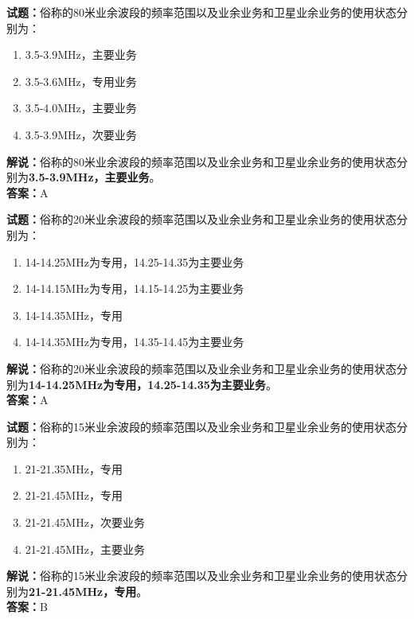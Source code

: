 \documentclass{ctexbook}
\begin{document}
\vspace{\baselineskip}

\noindent\textbf{试题：}俗称的80米业余波段的频率范围以及业余业务和卫星业余业务的使用状态分别为：
\begin{enumerate}[leftmargin=3em]
  \item 3.5-3.9\unit{\MHz}，主要业务
  \item 3.5-3.6\unit{\MHz}，专用业务
  \item 3.5-4.0\unit{\MHz}，主要业务
  \item 3.5-3.9\unit{\MHz}，次要业务
\end{enumerate}
\noindent\textbf{解说：}俗称的80米业余波段的频率范围以及业余业务和卫星业余业务的使用状态分别为\textbf{3.5-3.9\unit{\MHz}，主要业务}。\\\noindent\textbf{答案：}A

\vspace{\baselineskip}

\noindent\textbf{试题：}俗称的20米业余波段的频率范围以及业余业务和卫星业余业务的使用状态分别为：
\begin{enumerate}[leftmargin=3em]
  \item 14-14.25\unit{\MHz}为专用，14.25-14.35为主要业务
  \item 14-14.15\unit{\MHz}为专用，14.15-14.25为主要业务
  \item 14-14.35\unit{\MHz}，专用
  \item 14-14.35\unit{\MHz}为专用，14.35-14.45为主要业务
\end{enumerate}
\noindent\textbf{解说：}俗称的20米业余波段的频率范围以及业余业务和卫星业余业务的使用状态分别为\textbf{14-14.25\unit{\MHz}为专用，14.25-14.35为主要业务}。\\\noindent\textbf{答案：}A

\vspace{\baselineskip}

\noindent\textbf{试题：}俗称的15米业余波段的频率范围以及业余业务和卫星业余业务的使用状态分别为：
\begin{enumerate}[leftmargin=3em]
  \item 21-21.35\unit{\MHz}，专用
  \item 21-21.45\unit{\MHz}，专用
  \item 21-21.45\unit{\MHz}，次要业务
  \item 21-21.45\unit{\MHz}，主要业务
\end{enumerate}
\noindent\textbf{解说：}俗称的15米业余波段的频率范围以及业余业务和卫星业余业务的使用状态分别为\textbf{21-21.45\unit{\MHz}，专用}。\\\noindent\textbf{答案：}B
\end{document}
